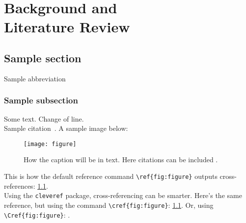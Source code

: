 \documentclass[../main/Progress.tex]{subfiles}
\begin{document}
	\chapter[Background and Literature Review]{Background and \\Literature Review}
	
	\section{Sample section}
	Sample abbreviation 
	\subsection{Sample subsection}
	Some text. 
	Change of line.\\
	Sample citation~\cite{Fiat:1987}. 
	A sample image below:
	\begin{figure}[h]
		\centering
		\texttt{[image: figure]}
		\caption[How the caption will appear in the list of figures]{How the caption will be in text. Here citations can be included \cite{Fiat:1987}.}
		\label{fig:figure}
	\end{figure}

This is how the default reference command \verb|\ref{fig:figure}| outputs cross-references: \ref{fig:figure}.\\
Using the \verb|cleveref| package, cross-referencing can be smarter. 
Here's the same reference, but using the command \verb|\cref{fig:figure}|: \cref{fig:figure}.
Or, using \verb|\Cref{fig:figure}|: .
\end{document}
